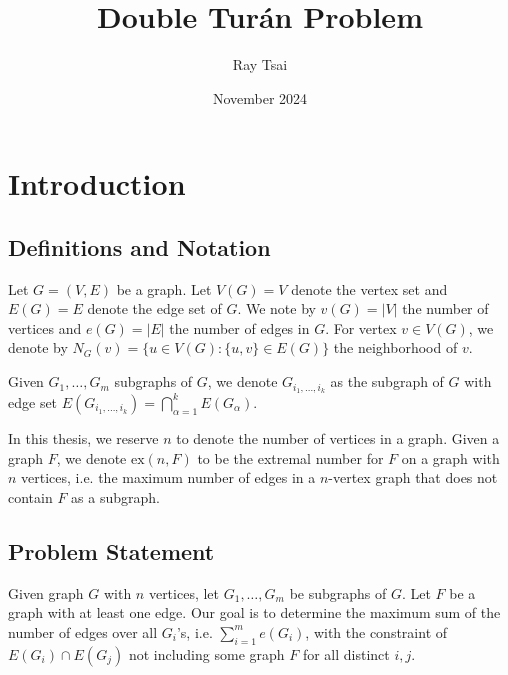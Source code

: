 \documentclass[12pt]{report}
\title{Double Turán Problem}
\author{Ray Tsai}
\date{November 2024}
\begin{document}
\maketitle



\tableofcontents

\chapter{Introduction}

\section{Definitions and Notation}
Let $G = (V, E)$ be a graph. Let $V(G) = V$ denote the vertex set and $E(G) = E$ denote the edge set
of $G$. We note by $v(G) = |V|$ the number of vertices and $e(G) = |E|$ the number of edges in $G$.
For vertex $v \in V(G)$, we denote by $N_G(v) = \{u \in V(G) : \{u, v\} \in E(G)\}$ the neighborhood
of $v$.

Given $G_1, \ldots, G_m$ subgraphs of $G$, we denote $G_{i_1, \ldots, i_k}$ as the subgraph of $G$
with edge set $E(G_{i_1, \ldots, i_k}) = \bigcap_{\alpha = 1}^k E(G_{\alpha})$. 

In this thesis, we reserve $n$ to denote the number of vertices in a graph. Given a graph $F$, we
denote $\text{ex}(n, F)$ to be the extremal number for $F$ on a graph with $n$ vertices, i.e. the
maximum number of edges in a $n$-vertex graph that does not contain $F$ as a subgraph.

\section{Problem Statement}

Given graph $G$ with $n$ vertices, let $G_1, \ldots, G_m$ be subgraphs of $G$. Let $F$ be a graph
with at least one edge. Our goal is to determine the maximum sum of the number of edges over all
$G_i$'s, i.e. $\sum_{i = 1}^m e(G_i)$, with the constraint of $E(G_i) \cap E(G_j)$ not including
some graph $F$ for all distinct $i, j$. 
\end{document}
